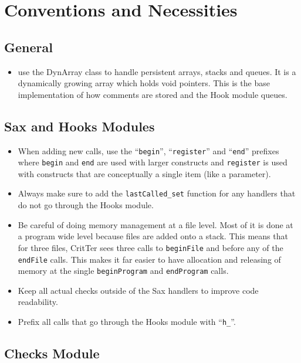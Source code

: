 \documentclass[12pt]{report}
\newcommand{\programName}{CritTer\xspace}
\begin{document}
\chapter{Conventions and Necessities}
\label{conventions}

\section{General}

\begin{itemize}
\item use the DynArray class to handle persistent arrays, stacks and queues. It is a dynamically growing array which holds void pointers. This is the base implementation of how comments are stored and the Hook module queues.

\end{itemize}

\section{Sax and Hooks Modules}

\begin{itemize}
\item When adding new calls, use the ``\lstinline{begin}'', ``\lstinline{register}'' and ``\lstinline{end}'' prefixes where \lstinline{begin} and \lstinline{end} are used with larger constructs and \lstinline{register} is used with constructs that are conceptually a single item (like a parameter).
\item Always make sure to add the \lstinline{lastCalled_set} function for any handlers that do not go through the Hooks module.
\item Be careful of doing memory management at a file level. Most of it is done at a program wide level because files are added onto a stack. This means that for three files, \programName sees three calls to \lstinline{beginFile} and before any of the \lstinline{endFile} calls. This makes it far easier to have allocation and releasing of memory at the single \lstinline{beginProgram} and \lstinline{endProgram} calls.
\item Keep all actual checks outside of the Sax handlers to improve code readability.
\item Prefix all calls that go through the Hooks module with ``\lstinline{h_}''.
\end{itemize}

\section{Checks Module}
\end{document}
